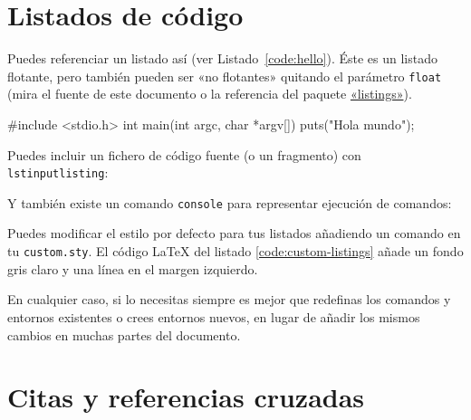 \section{Listados de código}
\label{sec:listado}

Puedes referenciar un listado así (ver Listado~\ref{code:hello}). Éste es un
listado flotante, pero también pueden ser «no flotantes» quitando el parámetro
\texttt{float} (mira el fuente de este documento o la referencia del paquete
\href{http://www.ctan.org/get/macros/latex/contrib/listings/listings.pdf}{«listings»}).

\begin{listing}[
  float=ht,
  language = C,
  caption  = {«Hola mundo» en C},
  label    = code:hello]
#include <stdio.h>
int main(int argc, char *argv[]) {
    puts("Hola mundo\n");
}
\end{listing}

\noindent
Puedes incluir un fichero de código fuente (o un fragmento) con \texttt{lstinputlisting}:



\noindent
Y también existe un comando \texttt{console} para representar ejecución de
comandos:


Puedes modificar el estilo por defecto para tus listados añadiendo un comando
 en tu \texttt{custom.sty}. El código \LaTeX{} del listado
\ref{code:custom-listings} añade un fondo gris claro y una línea en el margen
izquierdo.

\begin{listing}[
  float=h!,
  caption  = {Personalizando los listados de código},
  label    = code:custom-listings]
\end{listing}

En cualquier caso, si lo necesitas siempre es mejor que redefinas los comandos y entornos
existentes o crees entornos nuevos, en lugar de añadir los mismos cambios en
muchas partes del documento.



\section{Citas y referencias cruzadas}

